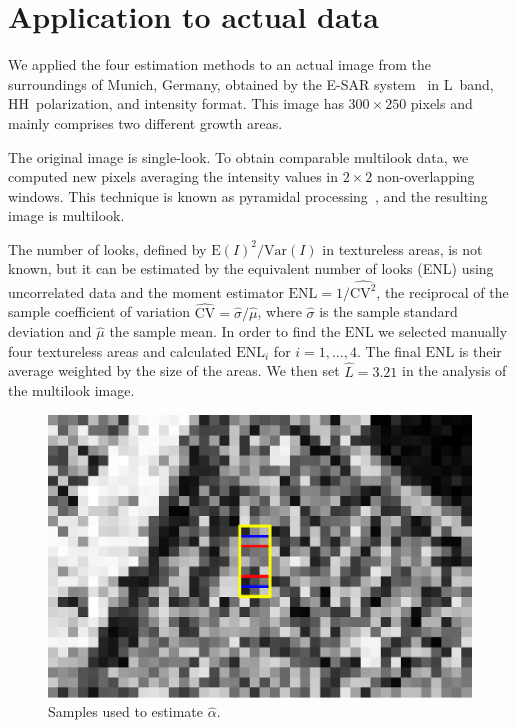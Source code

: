 \documentclass[twocolumn]{svjour3}
\begin{document}
	\section{Application to actual data}
	\label{application}
	
	We applied the four estimation methods to an actual image from the surroundings of Munich, Germany, obtained by the E-SAR system~\cite{Horn1996} in L~band, HH~polarization, and intensity format. 
	This image has $300\times250$ pixels and mainly comprises two different growth areas.
	
	The original image is single-look.
	To obtain comparable multilook data, we computed new pixels averaging the intensity values in $2\times2$ non-overlapping windows. This technique is known as pyramidal processing~\cite{Adelson1984}, and the resulting image is multilook.
	
	The number of looks, defined by ${\text{E}(I)^2}/{\text{Var}(I)}$ in textureless areas, is not known, but it can be estimated by the equivalent number of looks (ENL) using uncorrelated data and the moment estimator
	$\text{ENL}={1}/{\widehat{\text{CV}^2}}$, the reciprocal of the sample coefficient of variation $\widehat{\text{CV}}={\widehat{\sigma}}/{\widehat\mu}$, where $\widehat{\sigma}$ is the sample standard deviation and $\widehat\mu$ the sample mean.
	In order to find the $\text{ENL}$ we selected manually four textureless areas and calculated $\text{ENL}_i$ for $i=1, \ldots, 4$. 
	The final $\text{ENL}$ is their average weighted by the size of the areas. 
	We then set $\widehat L=3.21$ in the analysis of the multilook image.
	
	\begin{figure}[hbt]
		\centering
		\includegraphics[width=0.8\linewidth]{../../../Figures/PaperTesis/TresMuestrasAgrandada.eps}
		\caption{Samples used to estimate $\widehat{\alpha}$.}\label{TresMuestras} 
	\end{figure}
	
\end{document}
